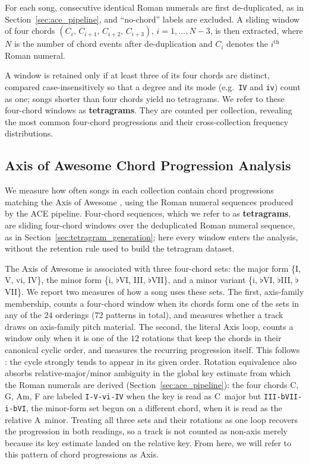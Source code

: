 \documentclass{article}
\newcommand{\rev}[1]{{\color{r2}#1}} %
\begin{document}
For each song, consecutive identical Roman numerals are first de-duplicated, as in Section~\ref{sec:ace_pipeline}, and ``no-chord'' labels are excluded. A sliding window of four chords $(C_{i},\,C_{i+1},\,C_{i+2},\,C_{i+3})$, $i = 1, \ldots, N-3$, is then extracted, where $N$ is the number of chord events after de-duplication and $C_i$ denotes the $i^{\text{th}}$ Roman numeral.

A window is retained only if at least three of its four chords are distinct, compared case-insensitively so that a degree and its mode (e.g.\ \texttt{IV} and \texttt{iv}) count as one; songs shorter than four chords yield no tetragrams. We refer to these four-chord windows as \textbf{tetragrams}. They are counted per collection, revealing the most common four-chord progressions and their cross-collection frequency distributions.

\subsection{Axis of Awesome Chord Progression Analysis}
\label{sec:axis}

We measure how often songs in each collection contain chord progressions matching the Axis of Awesome \citep{richards2017tonal}, using the Roman numeral sequences produced by the ACE pipeline. %
\rev{Four-chord sequences, which we refer to as \textbf{tetragrams}, are sliding four-chord windows over the deduplicated Roman numeral sequence, as in Section~\ref{sec:tetragram_generation}; here every window enters the analysis, without the retention rule used to build the tetragram dataset.}

The Axis of Awesome is associated with three four-chord sets: the major form \{I, V, vi, IV\}, the minor form \{i, $\flat$VI, III, $\flat$VII\}, and a minor variant \{i, $\flat$VI, $\flat$III, $\flat$VII\}. \rev{We report two measures of how a song uses these sets. The first, axis-family membership, counts a four-chord window when its chords form one of the sets in any of the $24$ orderings ($72$ patterns in total), and measures whether a track draws on axis-family pitch material. The second, the literal Axis loop, counts a window only when it is one of the $12$ rotations that keep the chords in their canonical cyclic order, and measures the recurring progression itself. This follows \citet{richards2017tonal}: the cycle strongly tends to appear in its given order. Rotation equivalence also absorbs relative-major/minor ambiguity in the global key estimate from which the Roman numerals are derived (Section~\ref{sec:ace_pipeline}): the four chords C, G, Am, F are labeled \texttt{I-V-vi-IV} when the key is read as C~major but \texttt{III-bVII-i-bVI}, the minor-form set begun on a different chord, when it is read as the relative A~minor. Treating all three sets and their rotations as one loop recovers the progression in both readings, so a track is not counted as non-axis merely because its key estimate landed on the relative key.} From here, we will refer to this pattern of chord progressions as Axis.
\end{document}
